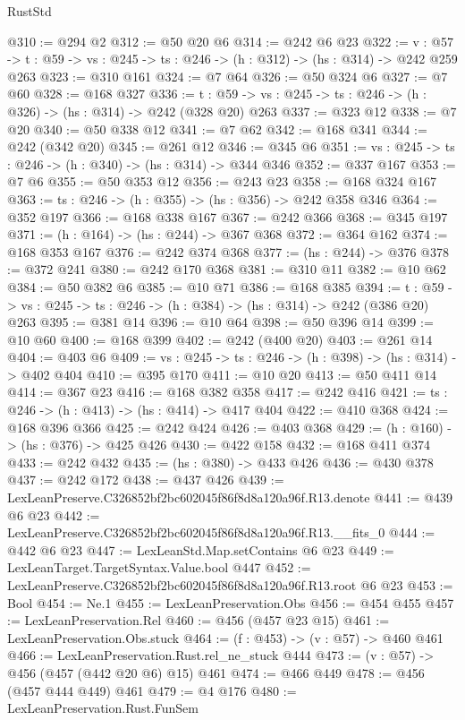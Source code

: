 \begin{lexlean}{RustStd}
\begin{coremodule}
@310 := @294 @2
@312 := @50 @20 @6
@314 := @242 @6 @23
@322 := {v : @57} ->
  {t : @59} -> {vs : @245} -> {ts : @246} -> (h : @312) -> (hs : @314) -> @242 @259 @263
@323 := @310 @161
@324 := @7 @64
@326 := @50 @324 @6
@327 := @7 @60
@328 := @168 @327
@336 := {t : @59} -> {vs : @245} -> {ts : @246} -> (h : @326) -> (hs : @314) -> @242 (@328 @20) @263
@337 := @323 @12
@338 := @7 @20
@340 := @50 @338 @12
@341 := @7 @62
@342 := @168 @341
@344 := @242 (@342 @20)
@345 := @261 @12
@346 := @345 @6
@351 := {vs : @245} -> {ts : @246} -> (h : @340) -> (hs : @314) -> @344 @346
@352 := @337 @167
@353 := @7 @6
@355 := @50 @353 @12
@356 := @243 @23
@358 := @168 @324 @167
@363 := {ts : @246} -> (h : @355) -> (hs : @356) -> @242 @358 @346
@364 := @352 @197
@366 := @168 @338 @167
@367 := @242 @366
@368 := @345 @197
@371 := (h : @164) -> (hs : @244) -> @367 @368
@372 := @364 @162
@374 := @168 @353 @167
@376 := @242 @374 @368
@377 := (hs : @244) -> @376
@378 := @372 @241
@380 := @242 @170 @368
@381 := @310 @11
@382 := @10 @62
@384 := @50 @382 @6
@385 := @10 @71
@386 := @168 @385
@394 := {t : @59} -> {vs : @245} -> {ts : @246} -> (h : @384) -> (hs : @314) -> @242 (@386 @20) @263
@395 := @381 @14
@396 := @10 @64
@398 := @50 @396 @14
@399 := @10 @60
@400 := @168 @399
@402 := @242 (@400 @20)
@403 := @261 @14
@404 := @403 @6
@409 := {vs : @245} -> {ts : @246} -> (h : @398) -> (hs : @314) -> @402 @404
@410 := @395 @170
@411 := @10 @20
@413 := @50 @411 @14
@414 := @367 @23
@416 := @168 @382 @358
@417 := @242 @416
@421 := {ts : @246} -> (h : @413) -> (hs : @414) -> @417 @404
@422 := @410 @368
@424 := @168 @396 @366
@425 := @242 @424
@426 := @403 @368
@429 := (h : @160) -> (hs : @376) -> @425 @426
@430 := @422 @158
@432 := @168 @411 @374
@433 := @242 @432
@435 := (hs : @380) -> @433 @426
@436 := @430 @378
@437 := @242 @172
@438 := @437 @426
@439 := LexLeanPreserve.C326852bf2bc602045f86f8d8a120a96f.R13.denote
@441 := @439 @6 @23
@442 := LexLeanPreserve.C326852bf2bc602045f86f8d8a120a96f.R13.__fits_0
@444 := @442 @6 @23
@447 := LexLeanStd.Map.setContains @6 @23
@449 := LexLeanTarget.TargetSyntax.Value.bool @447
@452 := LexLeanPreserve.C326852bf2bc602045f86f8d8a120a96f.R13.root @6 @23
@453 := Bool
@454 := Ne.{1}
@455 := LexLeanPreservation.Obs
@456 := @454 @455
@457 := LexLeanPreservation.Rel
@460 := @456 (@457 @23 @15)
@461 := LexLeanPreservation.Obs.stuck
@464 := (f : @453) -> (v : @57) -> @460 @461
@466 := LexLeanPreservation.Rust.rel_ne_stuck @444
@473 := (v : @57) -> @456 (@457 (@442 @20 @6) @15) @461
@474 := @466 @449
@478 := @456 (@457 @444 @449) @461
@479 := @4 @176
@480 := LexLeanPreservation.Rust.FunSem

\end{coremodule}
\end{lexlean}
